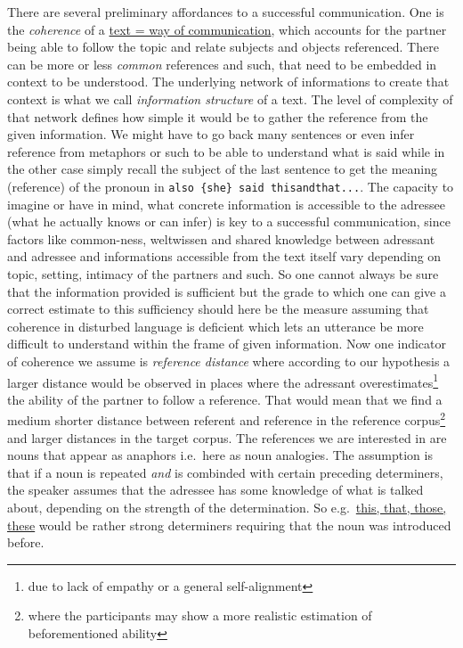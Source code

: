 \documentclass[
  12pt,
  oneside]{book}
\begin{document}
There are several preliminary affordances to a successful communication. One is the \emph{coherence} of a \href{}{text = way of communication}, which accounts for the partner being able to follow the topic and relate subjects and objects referenced. There can be more or less \emph{common} references and such, that need to be embedded in context to be understood. The underlying network of informations to create that context is what we call \emph{information structure} of a text. The level of complexity of that network defines how simple it would be to gather the reference from the given information. We might have to go back many sentences or even infer reference from metaphors or such to be able to understand what is said while in the other case simply recall the subject of the last sentence to get the meaning (reference) of the pronoun in \texttt{also\ \{she\}\ said\ thisandthat...}.
The capacity to imagine or have in mind, what concrete information is accessible to the adressee (what he actually knows or can infer) is key to a successful communication, since factors like common-ness, weltwissen and shared knowledge between adressant and adressee and informations accessible from the text itself vary depending on topic, setting, intimacy of the partners and such. So one cannot always be sure that the information provided is sufficient but the grade to which one can give a correct estimate to this sufficiency should here be the measure assuming that coherence in disturbed language is deficient which lets an utterance be more difficult to understand within the frame of given information.
Now one indicator of coherence we assume is \emph{reference distance} where according to our hypothesis a larger distance would be observed in places where the adressant overestimates\footnote{due to lack of empathy or a general self-alignment} the ability of the partner to follow a reference. That would mean that we find a medium shorter distance between referent and reference in the reference corpus\footnote{where the participants may show a more realistic estimation of beforementioned ability} and larger distances in the target corpus. The references we are interested in are nouns that appear as anaphors i.e.~here as noun analogies. The assumption is that if a noun is repeated \emph{and} is combinded with certain preceding determiners, the speaker assumes that the adressee has some knowledge of what is talked about, depending on the strength of the determination. So e.g.~\href{}{this, that, those, these} would be rather strong determiners requiring that the noun was introduced before.
\end{document}
